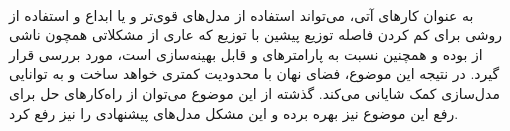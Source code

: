 \\
به عنوان کار‌های آتی، می‌تواند استفاده از مدل‌های قوی‌تر \normalizingflownets{} و یا ابداع و استفاده از روشی برای کم کردن فاصله توزیع پیشین با توزیع \marginal{} \encoder{} که عاری از مشکلاتی همچون \modecollapse{} ناشی از \gan{} بوده و همچنین نسبت به پارامتر‌های \encoder{} و \priordist{} قابل بهینه‌سازی است، مورد بررسی قرار گیرد. در نتیجه این موضوع، \encoder{} فضای نهان با محدودیت کمتری خواهد ساخت و به توانایی مدل‌سازی کمک شایانی می‌کند. گذشته از این موضوع می‌توان از راه‌کارهای حل \expbias{} برای رفع این موضوع نیز بهره برده و این مشکل مدل‌های پیشنهادی را نیز رفع کرد.